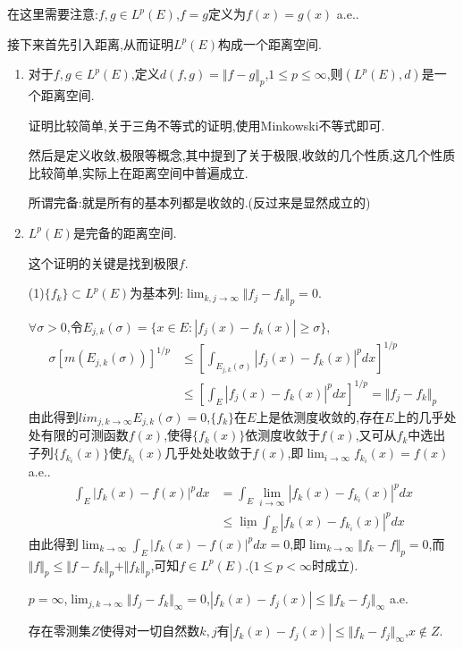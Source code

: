 \documentclass[12pt,a4paper,openany]{book}
\begin{document}
在这里需要注意:$f,g \in L^p(E)$,$f=g$定义为$f(x)=g(x)$ a.e..

接下来首先引入距离,从而证明$L^p(E)$构成一个距离空间.

\begin{enumerate}
\item 对于$f,g\in L^p(E)$,定义$d(f,g)=\Vert{f-g}\Vert_p$,$1 \le p \le \infty$,则$(L^p(E), d)$是一个距离空间.

证明比较简单,关于三角不等式的证明,使用Minkowski不等式即可.

然后是定义收敛,极限等概念,其中提到了关于极限,收敛的几个性质,这几个性质比较简单,实际上在距离空间中普遍成立.

所谓完备:就是所有的基本列都是收敛的.(反过来是显然成立的)

\item $L^p(E)$是完备的距离空间.

这个证明的关键是找到极限$f$.

(1)$\{f_k\} \subset L^p(E)$为基本列:$\lim_{k,j \rightarrow \infty}{\Vert{f_j - f_k}\Vert_p} = 0$.

$\forall \sigma >0$,令$E_{j,k}(\sigma)=\{x \in E: |f_j(x)-f_k(x)| \ge \sigma\}$,
\[
\begin{aligned}
\sigma[m(E_{j,k}(\sigma))]^{1/p} & \le [\int_{E_{j,k}(\sigma)}{|f_j(x)-f_k(x)|^pdx}]^{1/p}\\
&\le [\int_{E}{|f_j(x)-f_k(x)|^pdx}]^{1/p}=\Vert{f_j - f_k}\Vert_{p}
\end{aligned}
\]
由此得到$lim_{j,k \rightarrow \infty}{E_{j,k}(\sigma)}=0$,$\{f_k\}$在$E$上是依测度收敛的,存在$E$上的几乎处处有限的可测函数$f(x)$,使得$\{f_k(x)\}$依测度收敛于$f(x)$,又可从$f_k$中选出子列$\{f_{k_i}(x)\}$使$f_{k_i}(x)$几乎处处收敛于$f(x)$,即$\lim_{i \rightarrow \infty}{f_{k_i}(x)}=f(x)$ a.e..
\[
\begin{aligned}
\int_{E}{|f_k(x)-f(x)|^pdx} &= \int_{E}{\lim_{i \rightarrow \infty}{|f_k(x)-f_{k_i}(x)|^p}dx} \\
&\le \underline{\lim}{\int_{E}{|f_k(x)-f_{k_i}(x)|^pdx}}
\end{aligned}
\]
由此得到$\lim_{k \rightarrow \infty}{\int_{E}{|f_k(x)-f(x)|^pdx}}=0$,即$\lim_{k \rightarrow \infty}{\Vert{f_k-f}\Vert_p}=0$,而$\Vert{f}\Vert_p \le \Vert{f-f_k}\Vert_p + \Vert{f_k}\Vert_p$,可知$f \in L^p(E)$.($1 \le p < \infty$时成立).

$p = \infty$,$\lim_{j,k \rightarrow \infty}{\Vert{f_j-f_k}\Vert_{\infty}}=0$,$|f_k(x)-f_j(x)| \le \Vert{f_k-f_j}\Vert_{\infty}$ a.e.

存在零测集$Z$使得对一切自然数$k,j$有$|f_k(x)-f_j(x)| \le \Vert{f_k-f_j}\Vert_{\infty}$,$x \notin Z$.


\end{enumerate}
\end{document}
